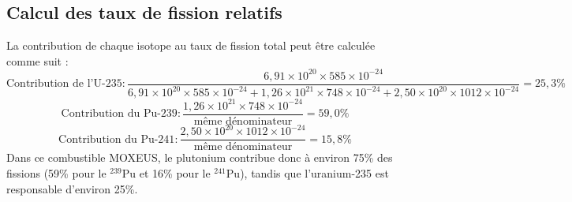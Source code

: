 \documentclass{article}
\begin{document}
\subsection{Calcul des taux de fission relatifs}
La contribution de chaque isotope au taux de fission total peut être calculée comme suit :
\begin{equation}
  \text{Contribution de l'U-235} : \frac{6,91 \times 10^{20} \times 585 \times 10^{-24}}{6,91 \times 10^{20} \times 585 \times 10^{-24} + 1,26 \times 10^{21} \times 748 \times 10^{-24} + 2,50 \times 10^{20} \times 1012 \times 10^{-24}} = 25,3\%
\end{equation}
\begin{equation}
  \text{Contribution du Pu-239} : \frac{1,26 \times 10^{21} \times 748 \times 10^{-24}}{\text{même dénominateur}} = 59,0\%
\end{equation}
\begin{equation}
  \text{Contribution du Pu-241} : \frac{2,50 \times 10^{20} \times 1012 \times 10^{-24}}{\text{même dénominateur}} = 15,8\%
\end{equation}
Dans ce combustible MOXEUS, le plutonium contribue donc à environ 75\% des fissions (59\% pour le $^{239}$Pu et 16\% pour le $^{241}$Pu), tandis que l'uranium-235 est responsable d'environ 25\%.
\end{document}
